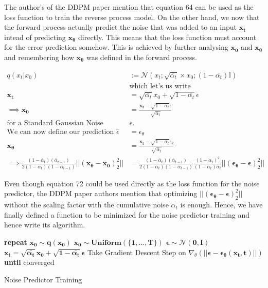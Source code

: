 \documentclass{article}
\begin{document}
The author's of the DDPM paper mention that equation 64 can be used as the loss function to train the reverse process model. On the other hand, we now that the forward process actually predict the noise that was added to an input $\mathbf{x_t}$ intead of predicting $\mathbf{x_\theta}$ directly. This means that the loss function must account for the error prediction somehow. This is achieved by further analysing $\mathbf{x_0}$ and $\mathbf{x_\theta}$ and remembering how $\mathbf{x_\theta}$ was defined in the forward process. 
	
\begin{align}
	q(x_t|x_0) &:= \mathcal{N}(x_{t}; \sqrt{\bar{\alpha_t}} \times x_0; (1 - \bar{\alpha_t})\mathbb{I}) \\
	&\text{which  let's us write } \\
	\mathbf{x_t} &= \sqrt{\bar{\alpha_t}}  x_0 +  \sqrt{1 - \bar{\alpha_t}}\epsilon \\
	\implies \mathbf{x_0} &= \frac{\mathbf{x_t} -  \sqrt{1-\bar{\alpha_t}}\epsilon}{\sqrt{\bar\alpha_t}}\\
	\text{for a Standard Gaussian Noise  } &\epsilon. \\
	\text{We can now define our prediction   } \hat\epsilon& = \epsilon_\theta\\
	\mathbf{x_\theta}  &= \frac{\mathbf{x_t} -  \sqrt{1-\bar{\alpha_t}}\epsilon_\theta}{\sqrt{\bar\alpha_t}} \\
	\implies 
	\frac{(1- \bar{\alpha}_t)(\bar\alpha_{t-1}) }{2(1-\alpha_t)(1- \bar\alpha_{t-1})}\big|\big| (\mathbf{x_\theta - x_0})^2_2 \big|\big| &= 	\frac{(1- \bar{\alpha}_t)(\bar\alpha_{t-1}) }{2(1-\alpha_t)(1- \bar\alpha_{t-1})} \frac{(1-\alpha_t)^2}{(1-\bar\alpha_t)\alpha_t}\big|\big| (\mathbf{\epsilon_\theta- \epsilon})^2_2 \big|\big|
\end{align}

Even though equation 72 could be used directly as the loss function for the noise predictor, the DDPM paper authors mention that optimizing $\big|\big| (\mathbf{\epsilon_\theta- \epsilon})^2_2 \big|\big|$ without the scaling factor with the cumulative noise $\alpha_t$ is enough. Hence, we have finally defined a function to be minimized for the noise predictor training and hence write its algorithm.

\begin{algorithm} 
	\begin{algorithmic}[1]
		\State \textbf{repeat}
		\State $\mathbf{x_0 \sim q(x_0)}$ 
		\State $\mathbf{x_0 \sim Uniform(\{1, \hdots, T\})}$ 
		\State $\mathbf{\epsilon \sim \mathcal{N}(0, I)}$ 
		\State $\mathbf{x_t = \sqrt{\bar{\alpha_t}}  x_0 +  \sqrt{1 - \bar{\alpha_t}}\epsilon }$ 
		\State Take Gradient Descent Step on  $\nabla_\theta(\mathbf{|| \epsilon - \epsilon_\theta(x_t, t)|| })$
		\State \textbf{until} converged
	\end{algorithmic} 
	\caption{Noise Predictor Training}
	\label{alg:algorithm1}
\end{algorithm}
\end{document}
